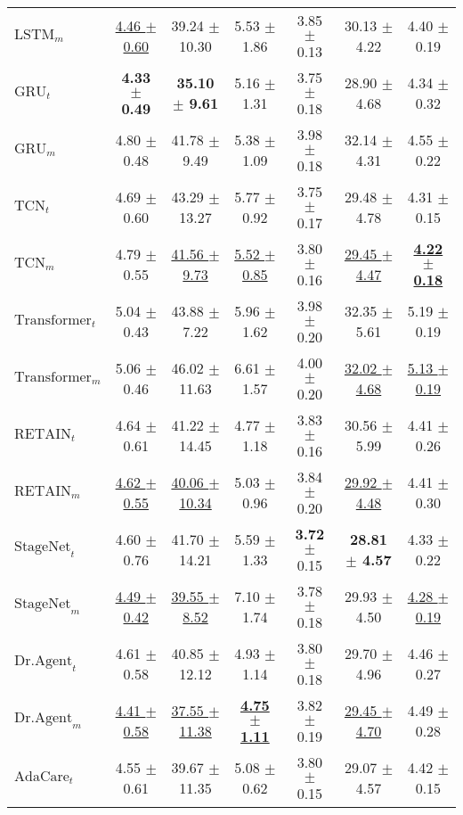 \begin{table}[htbp]
\begin{tabular}{l|ccc|ccc}
$\text{LSTM}_m$ & \underline{4.46 $\pm$ 0.60} & 39.24 $\pm$ 10.30 & 5.53 $\pm$ 1.86 & 3.85 $\pm$ 0.13 & 30.13 $\pm$ 4.22 & 4.40 $\pm$ 0.19 \\ 
$\text{GRU}_t$ & \textbf{4.33 $\pm$ 0.49} & \textbf{35.10 $\pm$ 9.61} & 5.16 $\pm$ 1.31 & 3.75 $\pm$ 0.18 & 28.90 $\pm$ 4.68 & 4.34 $\pm$ 0.32 \\ 
$\text{GRU}_m$ & 4.80 $\pm$ 0.48 & 41.78 $\pm$ 9.49 & 5.38 $\pm$ 1.09 & 3.98 $\pm$ 0.18 & 32.14 $\pm$ 4.31 & 4.55 $\pm$ 0.22 \\ 
$\text{TCN}_t$ & 4.69 $\pm$ 0.60 & 43.29 $\pm$ 13.27 & 5.77 $\pm$ 0.92 & 3.75 $\pm$ 0.17 & 29.48 $\pm$ 4.78 & 4.31 $\pm$ 0.15 \\ 
$\text{TCN}_m$ & 4.79 $\pm$ 0.55 & \underline{41.56 $\pm$ 9.73} & \underline{5.52 $\pm$ 0.85} & 3.80 $\pm$ 0.16 & \underline{29.45 $\pm$ 4.47} & \underline{\textbf{4.22 $\pm$ 0.18}} \\ 
$\text{Transformer}_t$ & 5.04 $\pm$ 0.43 & 43.88 $\pm$ 7.22 & 5.96 $\pm$ 1.62 & 3.98 $\pm$ 0.20 & 32.35 $\pm$ 5.61 & 5.19 $\pm$ 0.19 \\ 
$\text{Transformer}_m$ & 5.06 $\pm$ 0.46 & 46.02 $\pm$ 11.63 & 6.61 $\pm$ 1.57 & 4.00 $\pm$ 0.20 & \underline{32.02 $\pm$ 4.68} & \underline{5.13 $\pm$ 0.19} \\ 
\midrule
\midrule
$\text{RETAIN}_t$ & 4.64 $\pm$ 0.61 & 41.22 $\pm$ 14.45 & 4.77 $\pm$ 1.18 & 3.83 $\pm$ 0.16 & 30.56 $\pm$ 5.99 & 4.41 $\pm$ 0.26 \\ 
$\text{RETAIN}_m$ & \underline{4.62 $\pm$ 0.55} & \underline{40.06 $\pm$ 10.34} & 5.03 $\pm$ 0.96 & 3.84 $\pm$ 0.20 & \underline{29.92 $\pm$ 4.48} & 4.41 $\pm$ 0.30 \\ 
$\text{StageNet}_t$ & 4.60 $\pm$ 0.76 & 41.70 $\pm$ 14.21 & 5.59 $\pm$ 1.33 & \textbf{3.72} $\pm$ 0.15 & \textbf{28.81 $\pm$ 4.57} & 4.33 $\pm$ 0.22 \\ 
$\text{StageNet}_m$ & \underline{4.49 $\pm$ 0.42} & \underline{39.55 $\pm$ 8.52} & 7.10 $\pm$ 1.74 & 3.78 $\pm$ 0.18 & 29.93 $\pm$ 4.50 & \underline{4.28 $\pm$ 0.19} \\ 
$\text{Dr.Agent}_t$ & 4.61 $\pm$ 0.58 & 40.85 $\pm$ 12.12 & 4.93 $\pm$ 1.14 & 3.80 $\pm$ 0.18 & 29.70 $\pm$ 4.96 & 4.46 $\pm$ 0.27 \\ 
$\text{Dr.Agent}_m$ & \underline{4.41 $\pm$ 0.58} & \underline{37.55 $\pm$ 11.38} & \underline{\textbf{4.75 $\pm$ 1.11}} & 3.82 $\pm$ 0.19 & \underline{29.45 $\pm$ 4.70} & 4.49 $\pm$ 0.28 \\ 
$\text{AdaCare}_t$ & 4.55 $\pm$ 0.61 & 39.67 $\pm$ 11.35 & 5.08 $\pm$ 0.62 & 3.80 $\pm$ 0.15 & 29.07 $\pm$ 4.57 & 4.42 $\pm$ 0.15 \\ 

\end{tabular}
\end{table}

